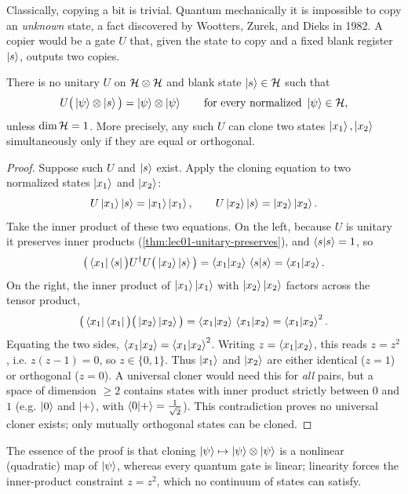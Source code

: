 Classically, copying a bit is trivial. Quantum mechanically it is impossible to copy
an \emph{unknown} state, a fact discovered by Wootters, Zurek, and Dieks in 1982. A
copier would be a gate $U$ that, given the state to copy and a fixed blank register
$\ket{s}$, outputs two copies.

\begin{theorem}\label{thm:lec01-nocloning}
There is no unitary $U$ on $\mathcal{H}\otimes\mathcal{H}$ and blank state $\ket{s}\in\mathcal{H}$ such
that
\[
  U\big(\ket{\psi}\otimes\ket{s}\big)=\ket{\psi}\otimes\ket{\psi}
  \qquad\text{for every normalized } \ket{\psi}\in\mathcal{H},
\]
unless $\dim\mathcal{H}=1$. More precisely, any such $U$ can clone two states
$\ket{x_{1}},\ket{x_{2}}$ simultaneously only if they are equal or orthogonal.
\end{theorem}

\begin{proof}
Suppose such $U$ and $\ket{s}$ exist. Apply the cloning equation to two normalized
states $\ket{x_{1}}$ and $\ket{x_{2}}$:
\[
  U\ket{x_{1}}\ket{s}=\ket{x_{1}}\ket{x_{1}},\qquad
  U\ket{x_{2}}\ket{s}=\ket{x_{2}}\ket{x_{2}}.
\]
Take the inner product of these two equations. On the left, because $U$ is unitary it
preserves inner products (\cref{thm:lec01-unitary-preserves}), and $\braket{s|s}=1$,
so
\[
  \big(\bra{x_{1}}\bra{s}\big)U^{\dagger} U\big(\ket{x_{2}}\ket{s}\big)
   = \braket{x_{1}|x_{2}}\,\braket{s|s}
   = \braket{x_{1}|x_{2}}.
\]
On the right, the inner product of $\ket{x_{1}}\ket{x_{1}}$ with
$\ket{x_{2}}\ket{x_{2}}$ factors across the tensor product,
\[
  \big(\bra{x_{1}}\bra{x_{1}}\big)\big(\ket{x_{2}}\ket{x_{2}}\big)
   = \braket{x_{1}|x_{2}}\,\braket{x_{1}|x_{2}}
   = \braket{x_{1}|x_{2}}^{2}.
\]
Equating the two sides, $\braket{x_{1}|x_{2}} = \braket{x_{1}|x_{2}}^{2}$. Writing
$z=\braket{x_{1}|x_{2}}$, this reads $z=z^{2}$, i.e. $z(z-1)=0$, so $z\in\{0,1\}$.
Thus $\ket{x_{1}}$ and $\ket{x_{2}}$ are either identical ($z=1$) or orthogonal
($z=0$). A universal cloner would need this for \emph{all} pairs, but a space of
dimension $\geq 2$ contains states with inner product strictly between $0$ and $1$
(e.g. $\ket{0}$ and $\ket{+}$, with $\braket{0|+}=\tfrac{1}{\sqrt2}$). This
contradiction proves no universal cloner exists; only mutually orthogonal states can
be cloned.
\end{proof}

The essence of the proof is that cloning $\ket{\psi}\mapsto\ket{\psi}\otimes\ket{\psi}$
is a nonlinear (quadratic) map of $\ket{\psi}$, whereas every quantum gate is linear;
linearity forces the inner-product constraint $z=z^{2}$, which no continuum of states
can satisfy.


